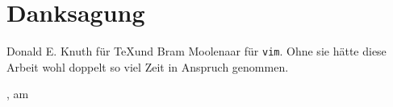 
\chapter*{Danksagung}

Donald E. Knuth für \TeX und Bram Moolenaar für \texttt{vim}. Ohne sie hätte diese Arbeit wohl doppelt so viel Zeit in Anspruch genommen.

\vspace{1.5cm}

\begin{center}
\raggedleft{\campusAuthor}
\end{center}

\vspace{1.5cm}

\campusCity, am \campusDate
